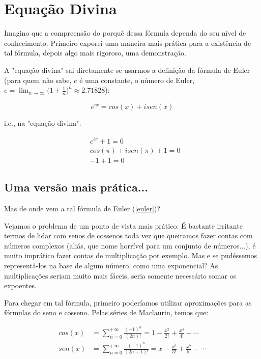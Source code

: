 \documentclass[a4paper]{article}
\begin{document}
\section*{Equação Divina}

Imagino que a compreensão do porquê dessa fórmula dependa do seu nível de conhecimento. Primeiro exporei uma maneira mais prática para a existência de tal fórmula, depois algo mais rigoroso, uma demonstração.

A "equação divina" sai diretamente se usarmos a definição da fórmula de Euler (para quem não sabe, \(e\) é uma constante, o número de Euler, \(e = \lim_{n \to \infty} \Big(1 + \frac{1}{n}\Big)^n \approx 2.71828\)):

\begin{equation} \label{euler}
e^{i x} = cos(x) + i sen(x)
\end{equation}

i.e., na "equação divina":

\begin{align} \label{eqdivinademo}
& e^{i \pi} + 1 = 0 \\
& cos(\pi) + i sen(\pi) + 1 = 0 \\
& -1 + 1 = 0
\end{align}

\subsection*{Uma versão mais prática...}

Mas de onde vem a tal fórmula de Euler (\ref{euler})?

Vejamos o problema de um ponto de vista mais prático. É bastante irritante termos de lidar com senos de cossenos toda vez que queiramos fazer contas com números complexos (aliás, que nome horrível para um conjunto de números...), é muito imprático fazer contas de multiplicação por exemplo. Mas e se pudéssemos representá-los na base de algum número, como uma exponencial? As multiplicações seriam muito mais fáceis, seria somente necessário somar os expoentes.

Para chegar em tal fórmula, primeiro poderíamos utilizar aproximações para as fórmulas do seno e cosseno. Pelas séries de Maclaurin, temos que:

\begin{align}
cos(x) &= \sum_{n = 0}^{+ \infty} \frac{(-1)^n}{(2n)!} = 1 - \frac{x^2}{2!} + \frac{x^4}{4!} - \cdots \\
sen(x) &= \sum_{n = 0}^{+ \infty} \frac{(-1)^n}{(2n+1)!} = x - \frac{x^3}{3!} + \frac{x^5}{5!} - \cdots
\end{align}
\end{document}
